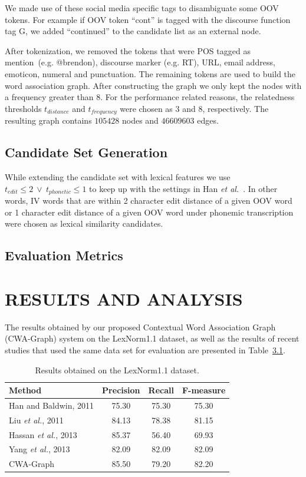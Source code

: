 \documentclass[a4paper,onesided,12pt]{report}
\begin{document}
We made use of these social media specific tags to disambiguate some OOV tokens. For example if OOV token ``cont'' is tagged with the discourse function tag G, we added ``continued'' to the candidate list as an external node.

After tokenization, we removed the tokens that were POS tagged as mention~(e.g. @brendon), discourse marker (e.g. RT), URL, email address, emoticon, numeral and punctuation. The remaining tokens are used to build the word association graph. After constructing the graph we only kept the nodes with a frequency greater than $8$. For the performance related reasons, the relatedness thresholds $t_{distance}$ and $t_{frequency}$  were chosen as $3$ and $8$, respectively. The resulting graph contains $105428$ nodes and $46609603$ edges.

\section{Candidate Set Generation}

While extending the candidate set with lexical features we use ${t_{edit}\leq 2}~\vee~{t_{phonetic} \leq 1}$ to keep up with the settings in Han \textit{et al.}~\cite{Han:2011:LNS:2002472.2002520}. In other words, IV words that are within 2 character edit distance of a given OOV word or 1 character edit distance of a given OOV word under phonemic transcription were chosen as lexical similarity candidates.

\section{Evaluation Metrics}

\chapter{RESULTS AND ANALYSIS}

The results obtained by our proposed Contextual Word Association Graph (CWA-Graph) system on the LexNorm1.1 dataset,
as well as the results of recent studies that used the same data set for evaluation are presented in Table~\ref{tab:results}.

\begin{table}[thb]
  \caption{Results obtained on the LexNorm1.1 dataset.}
  \centering
  \begin{tabular}[t]{|l|c|c|c|}
    \hline
    \textbf{Method} & \textbf{Precision} & \textbf{Recall} & \textbf{F-measure} \\
    \hline
    Han and Baldwin, 2011 & 75.30 & 75.30 & 75.30 \\\hline
    Liu \textit{et al.}, 2011 & 84.13 & 78.38 & 81.15 \\\hline
    Hassan \textit{et al.}, 2013 & 85.37 & 56.40 & 69.93 \\\hline
    Yang \textit{et al.}, 2013 & 82.09 & 82.09 & 82.09 \\\hline
    CWA-Graph   & 85.50 & 79.20 & 82.20 \\
    \hline
  \end{tabular}
  \label{tab:results}
\end{table}
\end{document}
